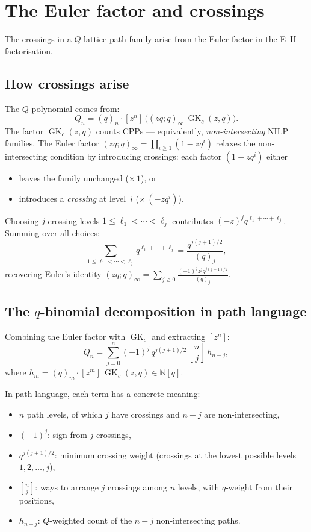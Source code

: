 \documentclass[11pt]{article}
\newcommand{\N}{\mathbb{N}}
\newcommand{\GK}{\operatorname{GK}}
\newcommand{\qpoch}[2]{(#1;#2)_\infty}
\newcommand{\qbin}[2]{\genfrac{[}{]}{0pt}{}{#1}{#2}}
\theoremstyle{plain}
\theoremstyle{definition}
\begin{document}
\section{The Euler factor and crossings}
\label{sec:euler}

The crossings in a $Q$-lattice path family arise from the
Euler factor in the E--H factorisation.


\subsection{How crossings arise}

The $Q$-polynomial comes from:
\[
  Q_n = (q)_n \cdot [z^n]\, \bigl(\qpoch{zq}{q}\,
  \GK_c(z,q)\bigr).
\]
The factor $\GK_c(z,q)$ counts CPPs --- equivalently,
\emph{non-intersecting} NILP families.  The Euler factor
$\qpoch{zq}{q} = \prod_{i \geq 1}(1 - zq^i)$ relaxes
the non-intersecting condition by introducing crossings:
each factor $(1 - zq^i)$ either
\begin{itemize}
  \item leaves the family unchanged ($\times\, 1$), or
  \item introduces a \emph{crossing} at level~$i$
    ($\times\, (-zq^i)$).
\end{itemize}
Choosing $j$ crossing levels
$1 \leq \ell_1 < \cdots < \ell_j$ contributes
$(-z)^j q^{\ell_1 + \cdots + \ell_j}$.  Summing over all
choices:
\[
  \sum_{1 \leq \ell_1 < \cdots < \ell_j}
    q^{\ell_1 + \cdots + \ell_j}
  = \frac{q^{j(j+1)/2}}{(q)_j},
\]
recovering Euler's identity
$\qpoch{zq}{q} = \sum_{j \geq 0}
  \frac{(-1)^j z^j q^{j(j+1)/2}}{(q)_j}$.


\subsection{The $q$-binomial decomposition in path language}

Combining the Euler factor with $\GK_c$ and extracting
$[z^n]$:
\begin{equation}\label{eq:q-binom-decomp}
  Q_n = \sum_{j=0}^{n} (-1)^j\, q^{j(j+1)/2}\,
    \qbin{n}{j}\, h_{n-j},
\end{equation}
where $h_m = (q)_m \cdot [z^m]\,\GK_c(z,q) \in \N[q]$.

In path language, each term has a concrete meaning:
\begin{itemize}
  \item $n$ path levels, of which $j$ have crossings and
    $n - j$ are non-intersecting,
  \item $(-1)^j$: sign from $j$ crossings,
  \item $q^{j(j+1)/2}$: minimum crossing weight (crossings
    at the lowest possible levels $1, 2, \ldots, j$),
  \item $\qbin{n}{j}$: ways to arrange $j$ crossings among
    $n$ levels, with $q$-weight from their positions,
  \item $h_{n-j}$: $Q$-weighted count of the $n-j$
    non-intersecting paths.
\end{itemize}
\end{document}
